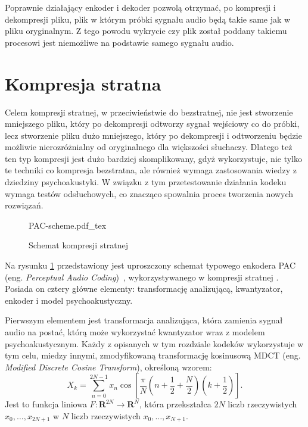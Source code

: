 \documentclass[pl,12pt]{aghdpl}
\let\Oldsection\section%
\renewcommand{\section}{\FloatBarrier\Oldsection}
\begin{document}
Poprawnie działający enkoder i dekoder pozwolą otrzymać, po kompresji i
dekompresji pliku, plik w którym próbki sygnału audio będą takie same jak w
pliku oryginalnym. Z tego powodu wykrycie czy plik został poddany takiemu
procesowi jest niemożliwe na podstawie samego sygnału audio.

\section{Kompresja stratna}

Celem kompresji stratnej, w przeciwieństwie do bezstratnej, nie jest stworzenie
mniejszego pliku, który po dekompresji odtworzy sygnał wejściowy co do próbki, lecz
stworzenie pliku dużo mniejszego, który po dekompresji i odtworzeniu będzie
możliwie nierozróżnialny od oryginalnego dla większości słuchaczy. Dlatego też
ten typ kompresji jest dużo bardziej skomplikowany, gdyż wykorzystuje, nie tylko
te techniki co kompresja bezstratna, ale również wymaga zastosowania wiedzy
z dziedziny psychoakustyki. W związku z tym przetestowanie działania kodeku
wymaga testów odsłuchowych, co znacząco spowalnia proces tworzenia nowych
rozwiązań.

\begin{figure}[!tbh]
  \centering
  {PAC-scheme.pdf_tex}
  \caption{Schemat kompresji stratnej}
  \label{fig:PAC_scheme}
\end{figure}

Na rysunku \ref{fig:PAC_scheme} przedstawiony jest uproszczony schemat typowego
enkodera PAC (eng. \textit{Perceptual Audio Coding})~\cite{BosiGoldberg2002,
Brandenburg1999}, wykorzystywanego w kompresji stratnej . Posiada on cztery
główne elementy: transformację analizującą, kwantyzator, enkoder i model
psychoakustyczny.

Pierwszym elementem jest transformacja analizująca, która zamienia sygnał audio
na postać, którą może wykorzystać kwantyzator wraz z modelem psychoakustycznym.
Każdy z opisanych w tym rozdziale kodeków wykorzystuje w tym celu, miedzy
innymi, zmodyfikowaną transformację kosinusową MDCT (eng. \textit{Modified
Discrete Cosine Transform}), określoną wzorem:
\begin{equation}
  X_k = \sum_{n=0}^{2N-1}x_n\cos\left[\frac{\pi}{N}
  \left(n+\frac{1}{2}+\frac{N}{2}\right)\left(k+\frac{1}{2}\right)\right].
\end{equation}
Jest to funkcja liniowa $F\colon \bm{R}^{2N} \to \bm{R}^N$, która przekształca
$2N$ liczb rzeczywistych $x_0, \dotsc, x_{2N+1}$ w $N$ liczb rzeczywistych
$x_0, \dotsc, x_{N+1}$.
\end{document}
